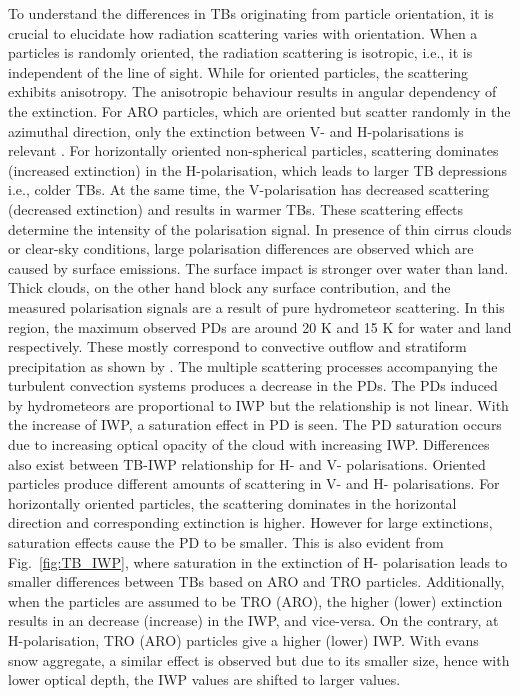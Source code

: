 \documentclass[amt, manuscript]{copernicus}
\begin{document}
To understand the differences in TBs originating from particle orientation, it is crucial to elucidate how radiation scattering varies with orientation. When a particles is randomly oriented, the radiation scattering is isotropic, i.e., it is independent of the line of sight. While for oriented particles, the scattering exhibits anisotropy. The anisotropic behaviour results in angular dependency of the extinction. For ARO particles, which are oriented but scatter randomly in the azimuthal direction, only the extinction between V- and H-polarisations is relevant \citep{brath:micro:20, barlakas:intro:21}. For horizontally oriented non-spherical particles, scattering dominates (increased extinction) in the H-polarisation, which leads to larger TB depressions i.e., colder TBs. At the same time, the V-polarisation has decreased scattering (decreased extinction) and results in warmer TBs. These scattering effects determine the intensity of the polarisation signal. In presence of thin cirrus clouds or clear-sky conditions, large polarisation differences are observed which are caused by surface emissions. The surface impact is stronger over water than land. Thick clouds, on the other hand block any surface contribution, and the measured polarisation signals are a result of pure hydrometeor scattering. In this region, the maximum observed PDs  are around 20\,\,K and 15\,\,K for  water and land respectively. These mostly correspond to convective outflow and stratiform precipitation as shown by \citet{gong:micro:17}. The multiple scattering processes accompanying the turbulent convection systems produces a decrease in the PDs. The PDs induced by hydrometeors are proportional to IWP but the relationship is not linear. With the increase of IWP, a saturation effect in PD is seen. The PD saturation occurs due to increasing optical opacity of the cloud with increasing IWP. Differences also exist between TB-IWP relationship for H- and V- polarisations. Oriented particles produce different amounts of scattering in V- and H- polarisations. For horizontally oriented particles, the scattering dominates in the horizontal direction and corresponding extinction is higher. However for large extinctions, saturation effects cause the PD to be smaller. This is also evident from Fig.~\ref{fig:TB_IWP}, where saturation in the extinction of H- polarisation leads to smaller differences between TBs based on ARO and TRO particles. Additionally, when the particles are assumed to be TRO (ARO), the higher (lower) extinction results in an decrease (increase) in the IWP, and vice-versa. On the contrary, at H-polarisation, TRO (ARO) particles give a higher (lower) IWP. With evans snow aggregate, a similar effect is observed but due to its smaller size, hence with lower optical depth, the IWP values are shifted to larger values.
\end{document}

